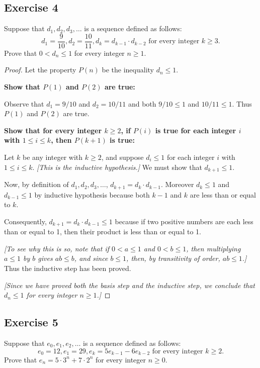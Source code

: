 \documentclass[14pt]{extarticle}
\begin{document}
\subsection{Exercise 4}
Suppose that $d_1, d_2, d_3, \ldots$ is a sequence defined
as follows:
\[
d_1 = \frac{9}{10}, d_2 = \frac{10}{11}, d_k = d_{k-1} \cdot d_{k-2} \text{ for every integer $k \geq 3$.}
\]
Prove that $0 < d_n \leq 1$ for every integer $n \geq 1$.

\begin{proof}
Let the property $P(n)$ be the inequality $d_n \leq 1$.

{\bf Show that $P(1)$ and $P(2)$ are true:}

Observe that $d_1 = 9/10$ and $d_2 = 10/11$ and both $9/10 \leq 1$ and $10 / 11 \leq 1$. Thus $P(1)$ and $P(2)$ are true.

{\bf Show that for every integer $k \geq 2$, if $P(i)$ is true for each integer $i$ with $1 \leq i \leq k$, then $P(k + 1)$ is true:}

Let $k$ be any integer with $k \geq 2$, and suppose $d_i \leq 1$ for each integer $i$ with $1 \leq i \leq k$. {\it [This is the inductive hypothesis.]} We must show that $d_{k+1} \leq 1$. 

Now, by definition of $d_1, d_2, d_3, \ldots$, $d_{k+1} = d_k \cdot d_{k-1}$. Moreover $d_k \leq 1$ and $d_{k-1} \leq 1$ by inductive hypothesis because both $k - 1$ and $k$ are less than or equal to $k$. 

Consequently, $d_{k+1} = d_k \cdot d_{k-1} \leq 1$ because if two positive numbers are each less than or equal to 1, then their product is less than or equal to 1. 

{\it [To see why this is so, note that if $0 < a \leq 1$ and $0 < b \leq 1$, then multiplying $a \leq 1$ by $b$ gives $ab \leq b$, and since $b \leq 1$, then, by transitivity of order, $ab \leq 1$.]} Thus the inductive step has been proved. 

{\it [Since we have proved both the basis step and the inductive step, we conclude that $d_n \leq 1$ for every integer $n \geq 1$.]}
\end{proof}

\subsection{Exercise 5}
Suppose that $e_0, e_1, e_2, \ldots$ is a sequence defined
as follows:
\[
e_0 = 12, e_1 = 29, e_k = 5e_{k-1} - 6e_{k-2} \text{ for every integer $k \geq 2$.}
\]
Prove that $e_n = 5 \cdot 3^n + 7 \cdot 2^n$ for every integer $n \geq 0$.
\end{document}
